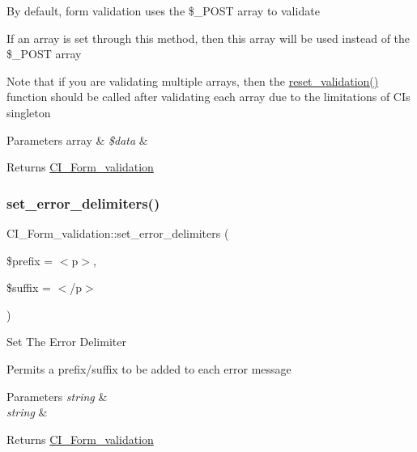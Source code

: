 By default, form validation uses the \$\+\_\+\+P\+O\+ST array to validate

If an array is set through this method, then this array will be used instead of the \$\+\_\+\+P\+O\+ST array

Note that if you are validating multiple arrays, then the \mbox{\hyperlink{class_c_i___form__validation_a5527d98847f46f4e64d0f0aec2916480}{reset\+\_\+validation()}} function should be called after validating each array due to the limitations of CI\textquotesingle{}s singleton


\begin{DoxyParams}[1]{Parameters}
array & {\em \$data} & \\
\hline
\end{DoxyParams}
\begin{DoxyReturn}{Returns}
\mbox{\hyperlink{class_c_i___form__validation}{C\+I\+\_\+\+Form\+\_\+validation}} 
\end{DoxyReturn}
\mbox{\label{class_c_i___form__validation_a6a561ecf5cdad0444f0c64a146d4d44c}} 
\subsubsection{\texorpdfstring{set\+\_\+error\+\_\+delimiters()}{set\_error\_delimiters()}}
{\footnotesize\ttfamily C\+I\+\_\+\+Form\+\_\+validation\+::set\+\_\+error\+\_\+delimiters (\begin{DoxyParamCaption}\item[{}]{\$prefix = {\ttfamily \textquotesingle{}$<$p$>$\textquotesingle{}},  }\item[{}]{\$suffix = {\ttfamily \textquotesingle{}$<$/p$>$\textquotesingle{}} }\end{DoxyParamCaption})}

Set The Error Delimiter

Permits a prefix/suffix to be added to each error message


\begin{DoxyParams}{Parameters}
{\em string} & \\
\hline
{\em string} & \\
\hline
\end{DoxyParams}
\begin{DoxyReturn}{Returns}
\mbox{\hyperlink{class_c_i___form__validation}{C\+I\+\_\+\+Form\+\_\+validation}} 
\end{DoxyReturn}
\mbox{\label{class_c_i___form__validation_af26170367050876cc1c0c9fd17269ae7}} 
